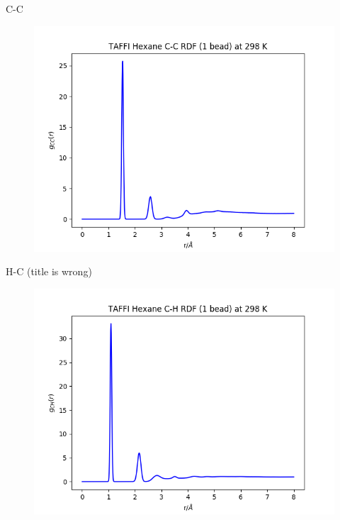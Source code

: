 \documentclass[12pt,reqno]{amsart}
\numberwithin{equation}{section}
\begin{document}
\begin{enumerate}
C-C
\begin{figure}[H]
\centering
\includegraphics[scale=0.6]{C_C-1bead-bonded-TAFFI-hexane-298-bin01-long}
\end{figure}

H-C (title is wrong)
\begin{figure}[H]
\centering
\includegraphics[scale=0.6]{C_H-1bead-bonded-TAFFI-hexane-298-bin01-long}
\end{figure}


\end{enumerate}
\end{document}
